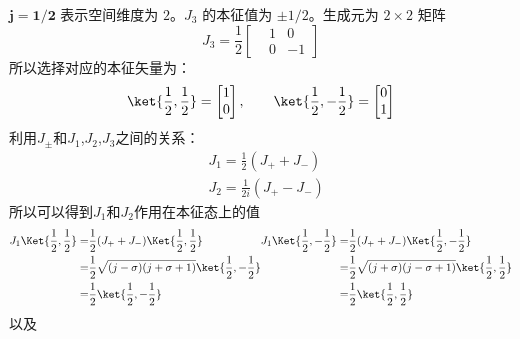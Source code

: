 \noindent
$\mathbf{j=1/2}$ 表示空间维度为 $2$。$J_3$ 的本征值为 $\pm 1/2$。生成元为 $2\times 2$ 矩阵
\begin{equation}
    J_3=\frac{1}{2}
    \begin{bmatrix}
        & 1&0\\
        & 0&-1
    \end{bmatrix}
\end{equation}
所以选择对应的本征矢量为：
\begin{equation}
    \ket{\frac{1}{2},\frac{1}{2}}
    =\begin{bmatrix}
        1 \\
        0
    \end{bmatrix},\qquad
    \ket{\frac{1}{2},-\frac{1}{2}}
    =\begin{bmatrix}
        0 \\
        1
    \end{bmatrix}
\end{equation}
利用$J_\pm$和$J_1$,$J_2$,$J_3$之间的关系：
\begin{equation}
    \begin{aligned}
        &J_1=\frac{1}{2}(J_++J_-)\\
        &J_2=\frac{1}{2i}(J_+-J_-)
    \end{aligned}
\end{equation}
所以可以得到$J_1$和$J_2$作用在本征态上的值
\begin{equation}
    \begin{aligned}
    J_1\Ket{\frac{1}{2},\frac{1}{2}}
    =&\frac{1}{2}(J_++J_-)\Ket{\frac{1}{2},\frac{1}{2}}\\
    =&\frac{1}{2}\sqrt{(j - \sigma)(j + \sigma + 1)}\ket{\frac{1}{2},-\frac{1}{2}}\\
    =&\frac{1}{2}\ket{\frac{1}{2},-\frac{1}{2}}\\
    \end{aligned}\\
    \begin{aligned}
        J_1\Ket{\frac{1}{2},-\frac{1}{2}}
        =&\frac{1}{2}(J_++J_-)\Ket{\frac{1}{2},-\frac{1}{2}}\\
        =&\frac{1}{2}\sqrt{(j + \sigma)(j - \sigma + 1)}\ket{\frac{1}{2},\frac{1}{2}}\\
        =&\frac{1}{2}\ket{\frac{1}{2},\frac{1}{2}}\\
    \end{aligned}
\end{equation}
以及
